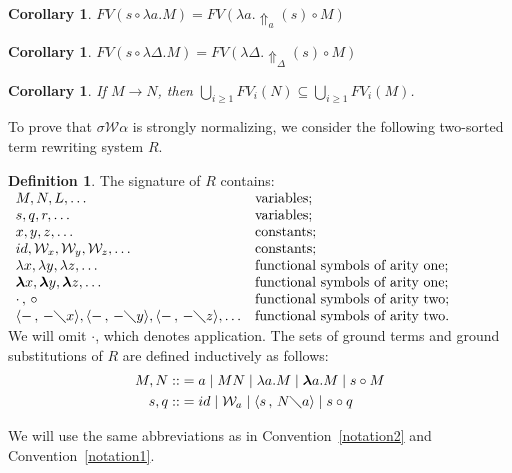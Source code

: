 \documentclass[11pt]{amsart}
\theoremstyle{plain}
\newtheorem{corollary}[theorem]{Corollary}
\theoremstyle{definition}
\newtheorem{definition}[theorem]{Definition}
\theoremstyle{remark}
\numberwithin{equation}{section}
\newcommand{\ci}{\circ}
\newcommand{\mi}{\,,\,}
\newcommand{\is}{\diagdown}
\newcommand{\arrow}{\rightarrow}
\newcommand{\la}{\langle}
\newcommand{\ra}{\rangle}
\newcommand{\x}{a}
\renewcommand{\pi}{\mathcal{W}}
\begin{document}
\begin{corollary}$FV(s\ci\lambda \x.M)=FV(\lambda
\x.\!\Uparrow_{\x}\!(s) \ci M)$
\end{corollary}
\begin{corollary}
$FV(s\ci\lambda \Delta.M)=FV(\lambda \Delta.
\!\Uparrow_{\Delta}\!(s) \ci M)$
\end{corollary}
\begin{corollary}If $M\arrow N$, then $\bigcup_{i\geqslant 1}FV_i(N)\subseteq \bigcup_{i\geqslant 1}FV_i(M)$.
\end{corollary}
 To prove that $\sigma\pi\alpha$ is strongly
normalizing, we consider the following two-sorted term rewriting
system $R$.
\begin{definition} The signature of $R$ contains:\\ $
\begin{array}{ll}
M,N,L,\ldots & \text{variables};\\
s,q,r,\ldots & \text{variables};\\
 x,y,z,\ldots & \text{constants};\\
id,\pi_x,\pi_y,\pi_z,\ldots &\text{constants};\\
\lambda x,\lambda y,\lambda z,\ldots & \text{functional symbols of
arity one};\\
\boldsymbol{\lambda} x,\boldsymbol{\lambda} y,\boldsymbol{\lambda}
z,\ldots
& \text{functional symbols of arity one};\\
\cdot\mi\circ & \text{functional symbols of arity two};\\
\la -\mi -\is x\ra,\la -\mi -\is y\ra,\la -\mi -\is z\ra,\ldots &
\text{functional symbols of arity two}.
\end{array}
$ \\[5pt]
 We
will omit $\cdot$, which denotes application. The sets of ground
terms and ground substitutions of $R$ are defined inductively as
follows:
\begin{align*}
M,N::&= \x \mid  MN \mid \lambda \x. M \mid\boldsymbol{\lambda} \x. M\mid s\ci M \\
s,q::&= id \mid \pi_{\x} \mid \langle s\mi  N\is \x \rangle \mid
s\ci q
\end{align*}
\end{definition}
 We will use the same abbreviations as in
Convention~\ref{notation2} and Convention~\ref{notation1}.
\newpage
\end{document}
